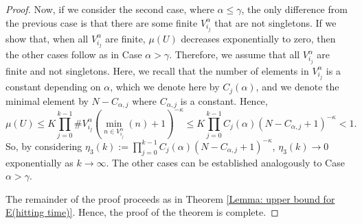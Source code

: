 \documentclass[11pt, reqno]{amsart}
\theoremstyle{plain}%
\newtheorem{remark}[theorem]{Remark}
\newtheorem{proposition}[theorem]{Proposition}
\theoremstyle{definition}
\theoremstyle{definition}
\def\E{\mathbb E}
\def\st{such that }
\def\ulx{\underline{x}}
\numberwithin{equation}{section}
\begin{document}
\begin{proof}
 Now, if we consider the second case, where $\alpha\le\gamma$, the only difference from the previous case is that there are some finite $V_{i_j}^\alpha$ that are not singletons. If we show that, when all $V_{i_j}^\alpha$ are finite, $\mu(U)$ decreases exponentially to zero, then the other cases follow as in Case $\alpha>\gamma$. Therefore, we assume that all $V_{i_j}^\alpha$ are finite and not singletons. Here, we recall that the number of elements in $V_{i_j}^\alpha$ is a constant depending on $\alpha$, which we denote here by $C_j(\alpha)$, and we denote the minimal element by $N-C_{\alpha,j}$ where $C_{\alpha,j}$ is a constant. Hence,
$$\mu(U)\le K \prod_{j=0}^{k-1} \#V_{i_j}^\alpha (\min_{n\in V_{i_j}^\alpha} (n)+1)^{-\kappa}\le K \prod_{j=0}^{k-1} C_j(\alpha)(N-C_{\alpha,j}+1)^{-\kappa}<1.$$
So, by considering $\eta_3(k):=\prod_{j=0}^{k-1} C_j(\alpha)(N-C_{\alpha,j}+1)^{-\kappa}$, $\eta_3(k)\to 0$ exponentially as $k\to \infty$. The other cases can be established analogously to Case $\alpha>\gamma$.

The remainder of the proof proceeds as in Theorem \ref{Lemma: upper bound for E(hitting time)}. Hence, the proof of the theorem is complete.
\end{proof}




\end{document}
